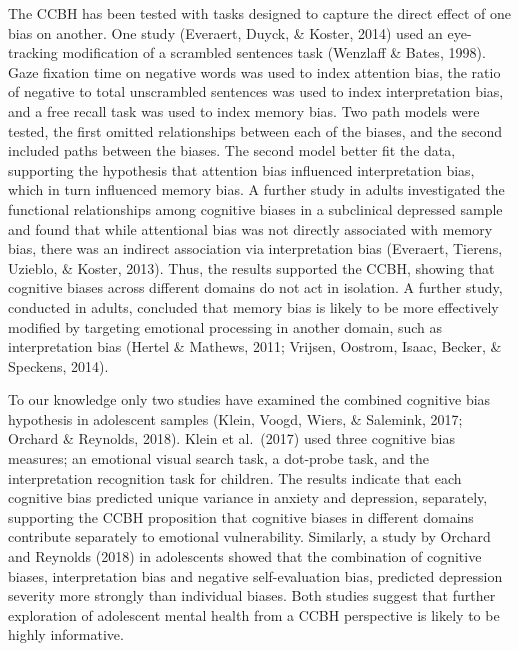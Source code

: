 \documentclass[man,floatsintext]{apa6}
\begin{document}
The CCBH has been tested with tasks designed to capture the direct effect of one bias on another. One study (Everaert, Duyck, \& Koster, 2014) used an eye-tracking modification of a scrambled sentences task (Wenzlaff \& Bates, 1998). Gaze fixation time on negative words was used to index attention bias, the ratio of negative to total unscrambled sentences was used to index interpretation bias, and a free recall task was used to index memory bias. Two path models were tested, the first omitted relationships between each of the biases, and the second included paths between the biases. The second model better fit the data, supporting the hypothesis that attention bias influenced interpretation bias, which in turn influenced memory bias. A further study in adults investigated the functional relationships among cognitive biases in a subclinical depressed sample and found that while attentional bias was not directly associated with memory bias, there was an indirect association via interpretation bias (Everaert, Tierens, Uzieblo, \& Koster, 2013). Thus, the results supported the CCBH, showing that cognitive biases across different domains do not act in isolation. A further study, conducted in adults, concluded that memory bias is likely to be more effectively modified by targeting emotional processing in another domain, such as interpretation bias (Hertel \& Mathews, 2011; Vrijsen, Oostrom, Isaac, Becker, \& Speckens, 2014).

To our knowledge only two studies have examined the combined cognitive bias hypothesis in adolescent samples (Klein, Voogd, Wiers, \& Salemink, 2017; Orchard \& Reynolds, 2018). Klein et al.~(2017) used three cognitive bias measures; an emotional visual search task, a dot-probe task, and the interpretation recognition task for children. The results indicate that each cognitive bias predicted unique variance in anxiety and depression, separately, supporting the CCBH proposition that cognitive biases in different domains contribute separately to emotional vulnerability. Similarly, a study by Orchard and Reynolds (2018) in adolescents showed that the combination of cognitive biases, interpretation bias and negative self-evaluation bias, predicted depression severity more strongly than individual biases. Both studies suggest that further exploration of adolescent mental health from a CCBH perspective is likely to be highly informative.
\end{document}
